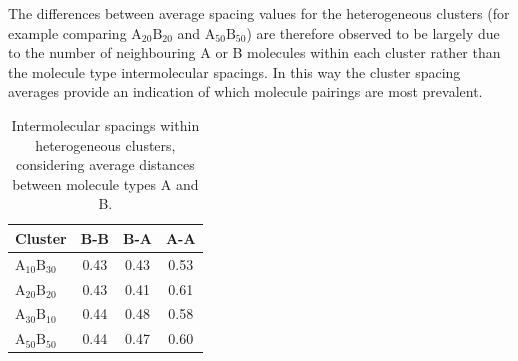 The differences between average spacing values for the heterogeneous clusters (for example comparing $\text{A}_{\text{20}}\text{B}_{\text{20}}$ and $\text{A}_{\text{50}}\text{B}_{\text{50}}$) are therefore observed to be largely due to the number of neighbouring A or B molecules within each cluster rather than the molecule type intermolecular spacings. %
In this way the cluster spacing averages provide an indication of which molecule pairings are most prevalent. %
%
\begin{table}[thb]
\centering
\caption{Intermolecular spacings within heterogeneous clusters, considering average distances between molecule types A and B.}
\label{table:mixedintermolecdists}
\begin{tabular}{lccc}
\hline
Cluster & B-B & B-A & A-A \\ \hline
$\text{A}_{\text{10}}\text{B}_{\text{30}}$ & 0.43 & 0.43 & 0.53 \\
$\text{A}_{\text{20}}\text{B}_{\text{20}}$ & 0.43 & 0.41 & 0.61 \\
$\text{A}_{\text{30}}\text{B}_{\text{10}}$ & 0.44 & 0.48 & 0.58 \\
$\text{A}_{\text{50}}\text{B}_{\text{50}}$ & 0.44 & 0.47 & 0.60 \\
\hline
\end{tabular}
\end{table}
%

